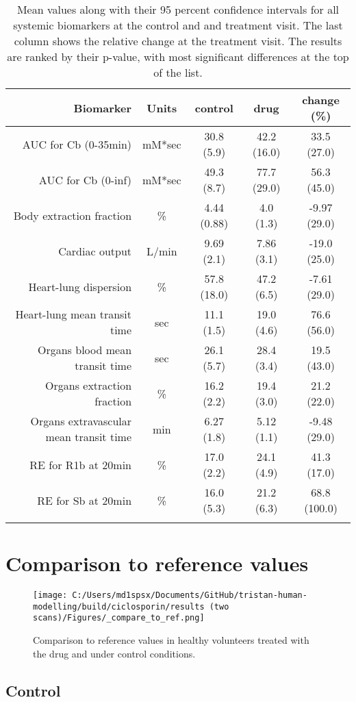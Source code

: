 \documentclass{epflreport}%
\begin{document}
\begin{longtable}{rcccc}%
\hline%
Biomarker&Units&control&drug&change (\%)\\%
\hline%
AUC for Cb (0{-}35min)&mM*sec&30.8 (5.9) &42.2 (16.0) &33.5 (27.0) \\%
AUC for Cb (0{-}inf)&mM*sec&49.3 (8.7) &77.7 (29.0) &56.3 (45.0) \\%
Body extraction fraction&\%&4.44 (0.88) &4.0 (1.3) &{-}9.97 (29.0) \\%
Cardiac output&L/min&9.69 (2.1) &7.86 (3.1) &{-}19.0 (25.0) \\%
Heart{-}lung dispersion&\%&57.8 (18.0) &47.2 (6.5) &{-}7.61 (29.0) \\%
Heart{-}lung mean transit time&sec&11.1 (1.5) &19.0 (4.6) &76.6 (56.0) \\%
Organs blood mean transit time&sec&26.1 (5.7) &28.4 (3.4) &19.5 (43.0) \\%
Organs extraction fraction&\%&16.2 (2.2) &19.4 (3.0) &21.2 (22.0) \\%
Organs extravascular mean transit time&min&6.27 (1.8) &5.12 (1.1) &{-}9.48 (29.0) \\%
RE for R1b at 20min&\%&17.0 (2.2) &24.1 (4.9) &41.3 (17.0) \\%
RE for Sb at 20min&\%&16.0 (5.3) &21.2 (6.3) &68.8 (100.0) \\%
\hline%
\caption{Mean values along with their 95 percent confidence intervals for all systemic biomarkers at the control and and treatment visit. The last column shows the relative change at the treatment visit. The results are ranked by their p-value, with most significant differences at the top of the list.} \\%
\end{longtable}%
\clearpage%
\section{Comparison to reference values}%
\label{sec:Comparisontoreferencevalues}%

%


\begin{figure}[h!]%
\centering%
\texttt{[image: C:/Users/md1spsx/Documents/GitHub/tristan-human-modelling/build/ciclosporin/results (two scans)/Figures/\_compare\_to\_ref.png]}%
\caption{Comparison to reference values in healthy volunteers treated with the drug and under control conditions.}%
\end{figure}

%
\clearpage%
\subsection{Control}%
\label{subsec:Control}%
\end{document}
